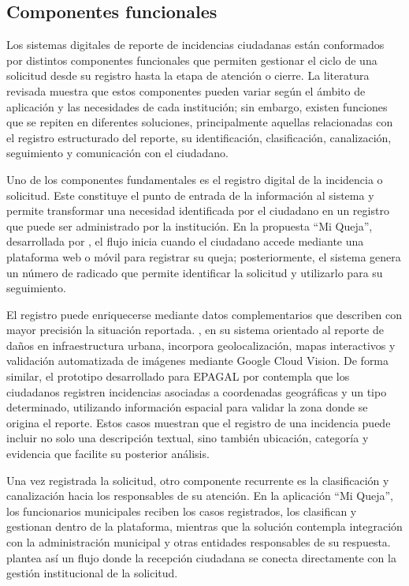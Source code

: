 \subsection{Componentes funcionales}

Los sistemas digitales de reporte de incidencias ciudadanas están conformados por distintos componentes funcionales que permiten gestionar el ciclo de una solicitud desde su registro hasta la etapa de atención o cierre. La literatura revisada muestra que estos componentes pueden variar según el ámbito de aplicación y las necesidades de cada institución; sin embargo, existen funciones que se repiten en diferentes soluciones, principalmente aquellas relacionadas con el registro estructurado del reporte, su identificación, clasificación, canalización, seguimiento y comunicación con el ciudadano.

Uno de los componentes fundamentales es el registro digital de la incidencia o solicitud. Este constituye el punto de entrada de la información al sistema y permite transformar una necesidad identificada por el ciudadano en un registro que puede ser administrado por la institución. En la propuesta “Mi Queja”, desarrollada por \cite{murillo2025aplicacion}, el flujo inicia cuando el ciudadano accede mediante una plataforma web o móvil para registrar su queja; posteriormente, el sistema genera un número de radicado que permite identificar la solicitud y utilizarlo para su seguimiento.

El registro puede enriquecerse mediante datos complementarios que describen con mayor precisión la situación reportada. \cite{parrales2025desarrollo}, en su sistema orientado al reporte de daños en infraestructura urbana, incorpora geolocalización, mapas interactivos y validación automatizada de imágenes mediante Google Cloud Vision. De forma similar, el prototipo desarrollado para EPAGAL por \cite{rodriguezdesarrollo} contempla que los ciudadanos registren incidencias asociadas a coordenadas geográficas y un tipo determinado, utilizando información espacial para validar la zona donde se origina el reporte. Estos casos muestran que el registro de una incidencia puede incluir no solo una descripción textual, sino también ubicación, categoría y evidencia que facilite su posterior análisis.

Una vez registrada la solicitud, otro componente recurrente es la clasificación y canalización hacia los responsables de su atención. En la aplicación “Mi Queja”, los funcionarios municipales reciben los casos registrados, los clasifican y gestionan dentro de la plataforma, mientras que la solución contempla integración con la administración municipal y otras entidades responsables de su respuesta. \cite{murillo2025aplicacion} plantea así un flujo donde la recepción ciudadana se conecta directamente con la gestión institucional de la solicitud.

